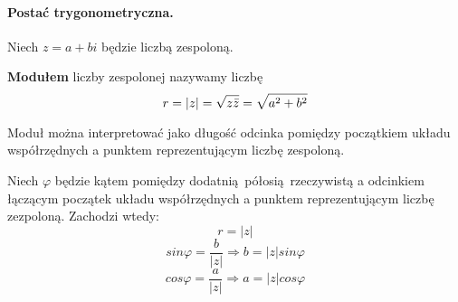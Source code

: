 \paragraph{Postać trygonometryczna.} Niech $z = a+bi$ będzie liczbą zespoloną.
\begin{definition}
    \textbf{Modułem} liczby zespolonej nazywamy liczbę
    \begin{equation*}
        r = \mathopen|z\mathclose| = \sqrt{z\bar{z}} = \sqrt{a^2+b^2}
    \end{equation*}
\end{definition}
Moduł można interpretować jako długość odcinka pomiędzy początkiem układu współrzędnych a punktem reprezentującym liczbę zespoloną.
\begin{center}
\end{center}
Niech $\varphi$ będzie kątem pomiędzy dodatnią półosią rzeczywistą a odcinkiem łączącym początek układu współrzędnych a punktem reprezentującym liczbę zezpoloną. Zachodzi wtedy:
\begin{equation*}
    r = \mathopen|z\mathclose|
\end{equation*}
\begin{equation*}
    sin \varphi = \frac{b}{\mathopen|z\mathclose|} \Longrightarrow b = \mathopen|z\mathclose| sin \varphi
\end{equation*}
\begin{equation*}
    cos \varphi = \frac{a}{\mathopen|z\mathclose|} \Longrightarrow a = \mathopen|z\mathclose| cos \varphi
\end{equation*}

